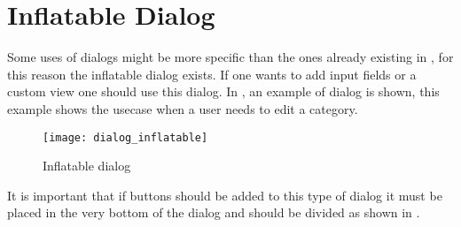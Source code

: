 \section{Inflatable Dialog}
\label{sec:inflatable_dialog}

Some uses of dialogs might be more specific than the ones already existing in \gc, for this reason the inflatable dialog exists. If one wants to add input fields or a custom view one should use this dialog. In , an example of dialog is shown, this example shows the usecase when a user needs to edit a category.

\begin{figure}[h]
	\centering
	\texttt{[image: dialog\_inflatable]}
	\caption{Inflatable dialog}
	\label{fig:inflatable_dialog}
\end{figure}
\FloatBarrier

\begin{note}
	It is important that if buttons should be added to this type of dialog it must be placed in the very bottom of the dialog and should be divided as shown in .
\end{note}





